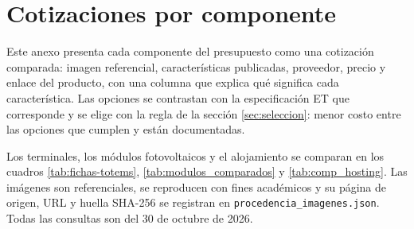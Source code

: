 \section{Cotizaciones por componente}\label{sec:cotizaciones}
Este anexo presenta cada componente del presupuesto como una cotización comparada: imagen referencial, características publicadas, proveedor, precio y enlace del producto, con una columna que explica qué significa cada característica. Las opciones se contrastan con la especificación ET que corresponde y se elige con la regla de la sección \ref{sec:seleccion}: menor costo entre las opciones que cumplen y están documentadas.

Los terminales, los módulos fotovoltaicos y el alojamiento se comparan en los cuadros \ref{tab:fichas-totems}, \ref{tab:modulos_comparados} y \ref{tab:comp_hosting}. Las imágenes son referenciales, se reproducen con fines académicos y su página de origen, URL y huella SHA-256 se registran en \texttt{procedencia\_imagenes.json}. Todas las consultas son del 30 de octubre de 2026.

